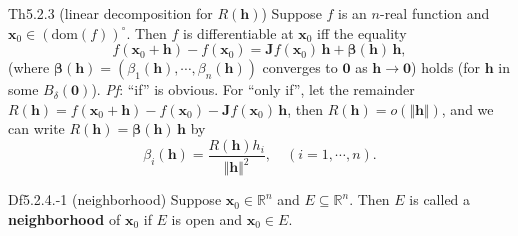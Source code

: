 \documentclass{article}
\begin{document}
\begin{Th}{Th5.2.3 (linear decomposition for $R(\pmb{h})$)}
    Suppose $f$ is an $n$-real function and $\pmb{x}_0\in (\text{dom}(f))^\circ$. Then $f$ is differentiable at $\pmb{x}_0$ iff the equality
    $$ f(\pmb{x}_0 + \pmb{h}) - f(\pmb{x}_0) = \pmb{J}f(\pmb{x}_0)\,\pmb{h} + \pmb{\beta}(\pmb{h})\,\pmb{h}, $$
    (where $\pmb{\beta}(\pmb{h}) = (\beta_1(\pmb{h}), \cdots, \beta_n(\pmb{h}))$ converges to $\pmb{0}$ as $\pmb{h}\rightarrow \pmb{0}$) holds (for $\pmb{h}$ in some $B_\delta(\pmb{0})$).
    \tcblower
    \textit{Pf}: ``if'' is obvious. For ``only if'', let the remainder $R(\pmb{h}) = f(\pmb{x}_0 + \pmb{h}) - f(\pmb{x}_0) - \pmb{J}f(\pmb{x}_0)\,\pmb{h}$, then $R(\pmb{h}) = o(\Vert \pmb{h}\Vert)$, and we can write $R(\pmb{h}) = \pmb{\beta}(\pmb{h})\,\pmb{h}$ by
    $$\beta_i(\pmb{h}) = \frac{R(\pmb{h})h_i}{\Vert \pmb{h}\Vert^2}, \quad (i=1,\cdots,n).$$
\end{Th}

\begin{Df}{Df5.2.4.-1 (neighborhood)}
    Suppose $\pmb{x}_0\in\mathbb{R}^n$ and $E\subseteq\mathbb{R}^n$. Then $E$ is called a \textbf{neighborhood} of $\pmb{x}_0$ if $E$ is open and $\pmb{x}_0\in E$.
\end{Df}
\end{document}
